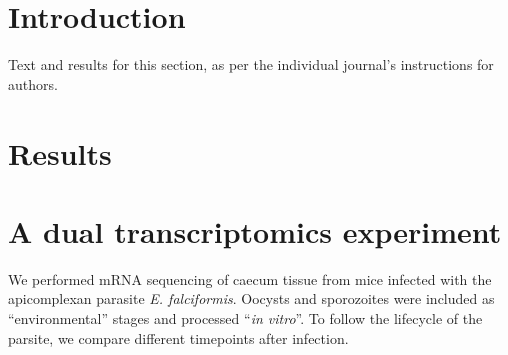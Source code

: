 \documentclass{bmcart}
\begin{document}



\section*{Introduction}
Text and results for this section, as per the individual journal's instructions for authors. 


  \section*{Results}


  \section*{A dual transcriptomics experiment}

We performed mRNA sequencing of caecum tissue from mice infected with
the apicomplexan parasite \textit{E. falciformis}. Oocysts and
sporozoites were included as ``environmental'' stages and processed
``\textit{in vitro}''. To follow the lifecycle of the parsite, we
compare different timepoints after infection.
\end{document}
